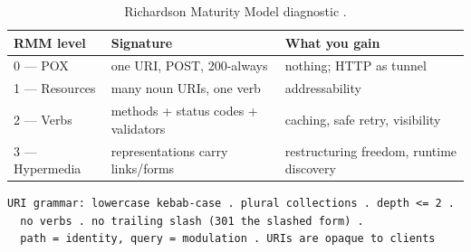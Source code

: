 \begin{table}[h]
  \centering
  \small
  \begin{tabularx}{\textwidth}{l X X}
    \toprule
    \textbf{RMM level} & \textbf{Signature} & \textbf{What you gain} \\
    \midrule
    0 --- POX & one URI, POST, 200-always & nothing; HTTP as tunnel \\
    1 --- Resources & many noun URIs, one verb & addressability \\
    2 --- Verbs & methods + status codes + validators & caching, safe retry, visibility \\
    3 --- Hypermedia & representations carry links/forms & restructuring freedom, runtime discovery \\
    \bottomrule
  \end{tabularx}
  \caption{Richardson Maturity Model diagnostic \cite{richardson2013restful}.}
\end{table}

\begin{verbatim}
URI grammar: lowercase kebab-case . plural collections . depth <= 2 .
  no verbs . no trailing slash (301 the slashed form) .
  path = identity, query = modulation . URIs are opaque to clients
\end{verbatim}


